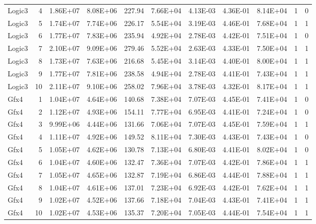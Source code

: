 \begin{longtable}{@{}l!{\vrule}r!{\vrule}c!{\vrule}c!{\vrule}c!{\vrule}c!{\vrule}c!{\vrule}c!{\vrule}c!{\vrule}c!{\vrule}c@{}}
Logic3 & 4 & 1.86E+07 & 8.08E+06 & 227.94 & 7.66E+04 & 4.13E-03 & 4.36E-01 & 8.14E+04 & 1 & 0 \\
Logic3 & 5 & 1.74E+07 & 7.74E+06 & 226.17 & 5.54E+04 & 3.19E-03 & 4.46E-01 & 7.68E+04 & 1 & 1 \\
Logic3 & 6 & 1.77E+07 & 7.83E+06 & 235.94 & 4.92E+04 & 2.78E-03 & 4.42E-01 & 7.51E+04 & 1 & 0 \\
Logic3 & 7 & 2.10E+07 & 9.09E+06 & 279.46 & 5.52E+04 & 2.63E-03 & 4.33E-01 & 7.50E+04 & 1 & 1 \\
Logic3 & 8 & 1.73E+07 & 7.63E+06 & 216.68 & 5.45E+04 & 3.14E-03 & 4.40E-01 & 8.00E+04 & 1 & 1 \\
Logic3 & 9 & 1.77E+07 & 7.81E+06 & 238.58 & 4.94E+04 & 2.78E-03 & 4.41E-01 & 7.43E+04 & 1 & 1 \\
Logic3 & 10 & 2.11E+07 & 9.10E+06 & 258.02 & 7.96E+04 & 3.78E-03 & 4.32E-01 & 8.17E+04 & 1 & 1 \\
\hline
{}
Gfx4 & 1 & 1.04E+07 & 4.64E+06 & 140.68 & 7.38E+04 & 7.07E-03 & 4.45E-01 & 7.41E+04 & 1 & 0 \\
Gfx4 & 2 & 1.12E+07 & 4.93E+06 & 154.11 & 7.77E+04 & 6.95E-03 & 4.41E-01 & 7.24E+04 & 1 & 0 \\
Gfx4 & 3 & 9.99E+06 & 4.44E+06 & 131.66 & 7.06E+04 & 7.07E-03 & 4.45E-01 & 7.59E+04 & 1 & 1 \\
Gfx4 & 4 & 1.11E+07 & 4.92E+06 & 149.52 & 8.11E+04 & 7.30E-03 & 4.43E-01 & 7.43E+04 & 1 & 0 \\
Gfx4 & 5 & 1.05E+07 & 4.62E+06 & 130.78 & 7.13E+04 & 6.80E-03 & 4.41E-01 & 8.02E+04 & 1 & 0 \\
Gfx4 & 6 & 1.04E+07 & 4.60E+06 & 132.47 & 7.36E+04 & 7.07E-03 & 4.42E-01 & 7.86E+04 & 1 & 1 \\
Gfx4 & 7 & 1.05E+07 & 4.65E+06 & 132.87 & 7.19E+04 & 6.86E-03 & 4.44E-01 & 7.88E+04 & 1 & 1 \\
Gfx4 & 8 & 1.04E+07 & 4.61E+06 & 137.01 & 7.23E+04 & 6.92E-03 & 4.42E-01 & 7.62E+04 & 1 & 1 \\
Gfx4 & 9 & 1.02E+07 & 4.52E+06 & 137.66 & 7.18E+04 & 7.04E-03 & 4.43E-01 & 7.41E+04 & 1 & 1 \\
Gfx4 & 10 & 1.02E+07 & 4.53E+06 & 135.37 & 7.20E+04 & 7.05E-03 & 4.44E-01 & 7.54E+04 & 1 & 1 \\

\end{longtable}

